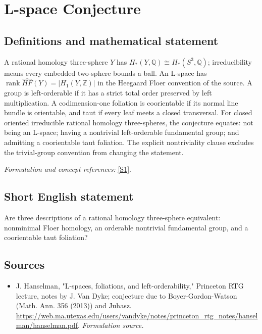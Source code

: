 \documentclass[11pt]{article}
\begin{document}
\section*{\texorpdfstring{L-space Conjecture}{L-space Conjecture}}\label{statement}
\subsection{Definitions and mathematical statement}
A rational homology three-sphere $Y$ has $H_*(Y,{\mathbb{Q}})\cong H_*(S^3,{\mathbb{Q}})$; irreducibility means every embedded two-sphere bounds a ball. An L-space has
$\operatorname{rank}\widehat{HF}(Y)=|H_1(Y,{\mathbb{Z}})|$ in the Heegaard Floer convention of the source. A group is left-orderable if it has a strict total order preserved by left multiplication. A codimension-one foliation is coorientable if its normal line bundle is orientable, and taut if every leaf meets a closed transversal. For closed oriented irreducible rational homology three-spheres, the conjecture equates: not being an L-space; having a nontrivial left-orderable fundamental group; and admitting a coorientable taut foliation. The explicit nontriviality clause excludes the trivial-group convention from changing the statement.
\par\smallskip\textit{Formulation and concept references:} \href{https://web.ma.utexas.edu/users/vandyke/notes/princeton_rtg_notes/hanselman/hanselman.pdf}{[S1]}.

\subsection{Short English statement}
Are three descriptions of a rational homology three-sphere equivalent: nonminimal Floer homology, an orderable nontrivial fundamental group, and a coorientable taut foliation?
\subsection{Sources}
\begin{itemize}
\item[S1]J. Hanselman, "L-spaces, foliations, and left-orderability," Princeton RTG lecture, notes by J. Van Dyke; conjecture due to Boyer-Gordon-Watson (Math. Ann. 356 (2013)) and Juhasz.
\url{https://web.ma.utexas.edu/users/vandyke/notes/princeton_rtg_notes/hanselman/hanselman.pdf}.
\textit{Formulation source.}
\end{itemize}
\end{document}
